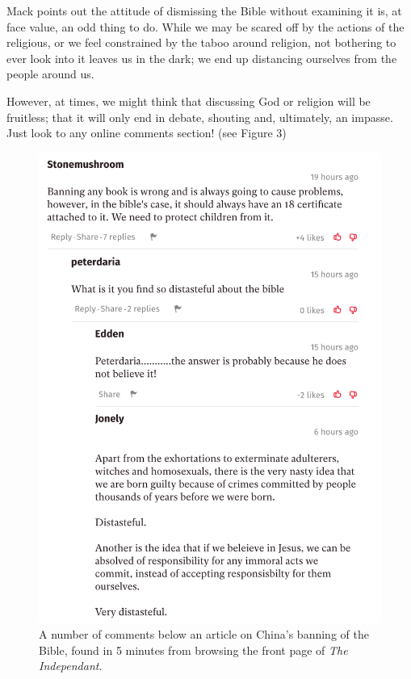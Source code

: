 \documentclass[]{article}
\begin{document}
Mack points out the attitude of dismissing the Bible without examining
it is, at face value, an odd thing to do. While we may be scared off by
the actions of the religious, or we feel constrained by the taboo around
religion, not bothering to ever look into it leaves us in the dark; we
end up distancing ourselves from the people around us.

However, at times, we might think that discussing God or religion will
be fruitless; that it will only end in debate, shouting and, ultimately,
an impasse. Just look to any online comments section! (see Figure 3)

\begin{figure}
\centering
\includegraphics{./NewspaperComments.png}
\caption{A number of comments below an article on China's banning of the
Bible, found in 5 minutes from browsing the front page of \emph{The
Independant}.\autocite{OppenheimChinacrackssales2018}}
\end{figure}
\end{document}
